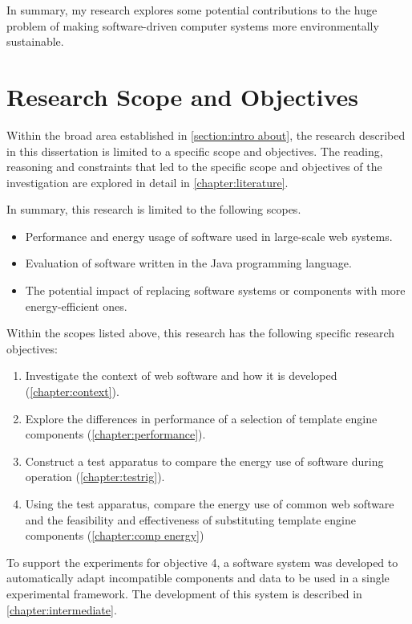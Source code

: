 \begin{leftbar}
In summary, my research explores some potential contributions to the huge problem of making software-driven computer systems more environmentally sustainable.
\end{leftbar}

\newpage
\section{Research Scope and Objectives}
\label{section:scope and objectives}

Within the broad area established in \autoref{section:intro about}, the research described in this dissertation is limited to a specific scope and objectives. The reading, reasoning and constraints that led to the specific scope and objectives of the investigation are explored in detail in \autoref{chapter:literature}.

In summary, this research is limited to the following scopes.

\begin{itemize}
    \item Performance and energy usage of software used in large-scale web systems.
    \item Evaluation of software written in the Java \gls{programming language}.
    \item The potential impact of replacing software systems or components with more energy-efficient ones.
\end{itemize}

Within the scopes listed above, this research has the following specific research objectives:

\begin{enumerate}
\item Investigate the context of web software and how it is developed (\autoref{chapter:context}).
\item Explore the differences in performance of a selection of \gls{template engine} components (\autoref{chapter:performance}).
\item Construct a test apparatus to compare the energy use of software during operation (\autoref{chapter:testrig}).
\item Using the test apparatus, compare the energy use of common web software and the feasibility and effectiveness of substituting template engine components (\autoref{chapter:comp energy})
\end{enumerate}

To support the experiments for objective 4, a software system was developed to automatically adapt incompatible components and data to be used in a single experimental framework. The development of this system is described in \autoref{chapter:intermediate}.

